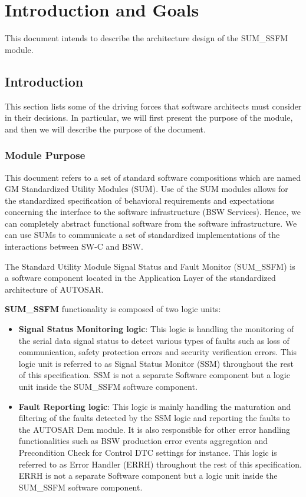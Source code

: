\chapter{Introduction and Goals}

This document intends to describe the architecture design of the SUM\_SSFM module.

\section{Introduction}
This section lists some of the driving forces that software architects must consider in their decisions. In particular, we will first present the purpose of the module, and then we will describe the purpose of the document.

\subsection{Module Purpose}

This document refers to a set of standard software compositions which are named GM Standardized Utility Modules (SUM).
Use of the SUM modules allows for the standardized specification of behavioral requirements and expectations concerning the interface to the software infrastructure (BSW Services).
Hence, we can completely abstract functional software from the software infrastructure.
We can use SUMs to communicate a set of standardized implementations of the interactions between SW-C and BSW.

The Standard Utility Module Signal Status and Fault Monitor (SUM\_SSFM) is a software component located in the Application Layer of the standardized architecture of AUTOSAR.

\textbf{SUM\_SSFM} functionality is composed of two logic units:
\begin{itemize}
	\item \textbf{Signal Status Monitoring logic}: This logic is handling the monitoring of the serial data signal status to detect various types of faults such as loss of communication, safety protection errors and security verification errors. This logic unit is referred to as Signal Status Monitor (SSM) throughout the rest of this specification. SSM is not a separate Software component but a logic unit inside the SUM\_SSFM software component.
	\item \textbf{Fault Reporting logic}: This logic is mainly handling the maturation and filtering of the faults detected by the SSM logic and reporting the faults to the AUTOSAR Dem module. It is also responsible for other error handling functionalities such as BSW production error events aggregation and Precondition Check for Control DTC settings for instance. This logic is referred to as Error Handler (ERRH) throughout the rest of this specification. ERRH is not a separate Software component but a logic unit inside the SUM\_SSFM software component.
\end{itemize}

